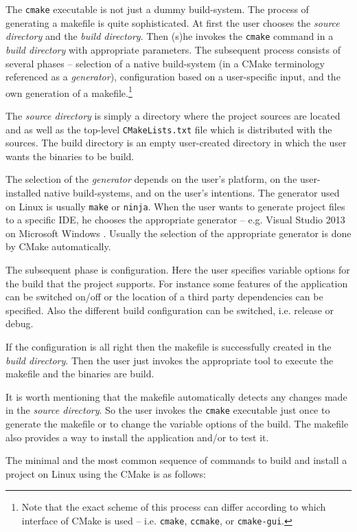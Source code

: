 \documentclass[12pt,oneside]{fithesis2}
\begin{document}
The \texttt{cmake} executable is not just a dummy build-system. The process of generating a makefile is quite sophisticated. At first the user chooses the \emph{source directory} and the \emph{build directory}. Then (s)he invokes the \texttt{cmake} command in a \emph{build directory} with appropriate parameters. The subsequent process consists of several phases -- selection of a native build-system (in a CMake terminology referenced as a \emph{generator}), configuration based on a user-specific input, and the own generation of a makefile.\footnote{Note that the exact scheme of this process can differ according to which interface of CMake is used -- i.e. \texttt{cmake}, \texttt{ccmake}, or \texttt{cmake-gui}.}

The \emph{source directory} is simply a directory where the project sources are located and as well as the top-level \texttt{CMakeLists.txt} file which is distributed with the sources. The build directory is an empty user-created directory in which the user wants the binaries to be build.

The selection of the \emph{generator} depends on the user's platform, on the user-installed native build-systems, and on the user's intentions. The generator used on Linux is usually \texttt{make} or \texttt{ninja}. When the user wants to generate project files to a specific IDE, he chooses the appropriate generator -- e.g. Visual Studio 2013 \cite{msvc} on Microsoft Windows \cite{win}. Usually the selection of the appropriate generator is done by CMake automatically.

The subsequent phase is configuration. Here the user specifies variable options for the build that the project supports. For instance some features of the application can be switched on/off or the location of a third party dependencies can be specified. Also the different build configuration can be switched, i.e. release or debug.

If the configuration is all right then the makefile is successfully created in the \emph{build directory}. Then the user just invokes the appropriate tool to execute the makefile and the binaries are build.

It is worth mentioning that the makefile automatically detects any changes made in the \emph{source directory}. So the user invokes the \texttt{cmake} executable just once to generate the makefile or to change the variable options of the build. The makefile also provides a way to install the application and/or to test it.

The minimal and the most common sequence of commands to build and install a project on Linux using the CMake is as follows:
\end{document}
